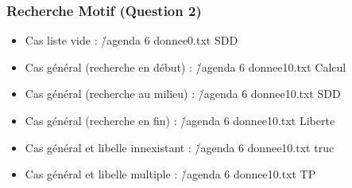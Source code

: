 \documentclass{report}
\begin{document}
\subsubsection{Recherche Motif (Question 2)}
\begin{itemize}
    \item Cas liste vide : \./agenda 6 donnee0.txt SDD
\vspace{0.5cm}
\vspace{0.5cm}

\vspace{0.5cm}
\vspace{0.5cm}

    \item Cas général (recherche en début) : \./agenda 6 donnee10.txt Calcul
\vspace{0.5cm}

\vspace{0.5cm}

    \item Cas général (recherche au milieu) : \./agenda 6 donnee10.txt SDD
\vspace{0.5cm}

\vspace{0.5cm}

    \item Cas général (recherche en fin) : \./agenda 6 donnee10.txt Liberte
\vspace{0.5cm}

\vspace{0.5cm}

    \item Cas général et libelle innexistant : \./agenda 6 donnee10.txt truc
\vspace{0.5cm}

\vspace{0.5cm}

    \item Cas général et libelle multiple : \./agenda 6 donnee10.txt TP
\vspace{0.5cm}

\vspace{0.5cm}

\end{itemize}
\end{document}
